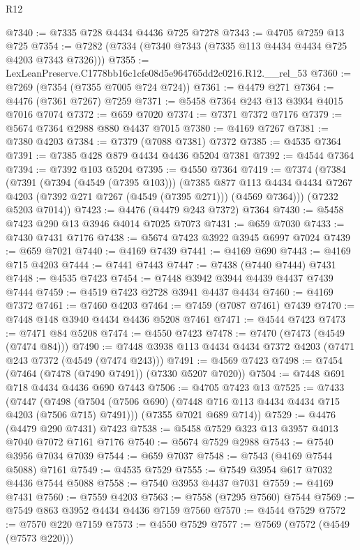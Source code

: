 \begin{lexlean}{R12}
\begin{coremodule}
@7340 := @7335 @728 @4434 @4436 @725 @7278
@7343 := @4705 @7259 @13 @725
@7354 := @7282 (@7334 (@7340 @7343 (@7335 @113 @4434 @4434 @725 @4203 @7343 @7326)))
@7355 := LexLeanPreserve.C1778bb16c1cfe08d5e964765dd2c0216.R12.__rel_53
@7360 := @7269 (@7354 (@7355 @7005 @724 @724))
@7361 := @4479 @271
@7364 := @4476 (@7361 @7267) @7259
@7371 := @5458 @7364 @243 @13 @3934 @4015 @7016 @7074
@7372 := @659 @7020
@7374 := @7371 @7372 @7176
@7379 := @5674 @7364 @2988 @880 @4437 @7015
@7380 := @4169 @7267
@7381 := @7380 @4203
@7384 := @7379 (@7088 @7381) @7372
@7385 := @4535 @7364
@7391 := @7385 @428 @879 @4434 @4436 @5204 @7381
@7392 := @4544 @7364
@7394 := @7392 @103 @5204
@7395 := @4550 @7364
@7419 := @7374
    (@7384
      (@7391
        (@7394 (@4549 (@7395 @103)))
        (@7385
          @877
          @113
          @4434
          @4434
          @7267
          @4203
          (@7392 @271 @7267 (@4549 (@7395 @271)))
          (@4569 @7364)))
      (@7232 @5203 @7014))
@7423 := @4476 (@4479 @243 @7372) @7364
@7430 := @5458 @7423 @290 @13 @3946 @4014 @7025 @7073
@7431 := @659 @7030
@7433 := @7430 @7431 @7176
@7438 := @5674 @7423 @3922 @3945 @6997 @7024
@7439 := @659 @7021
@7440 := @4169 @7439
@7441 := @4169 @690
@7443 := @4169 @715 @4203
@7444 := @7441 @7443
@7447 := @7438 (@7440 @7444) @7431
@7448 := @4535 @7423
@7454 := @7448 @3942 @3944 @4439 @4437 @7439 @7444
@7459 := @4519 @7423 @2728 @3941 @4437 @4434
@7460 := @4169 @7372
@7461 := @7460 @4203
@7464 := @7459 (@7087 @7461) @7439
@7470 := @7448 @148 @3940 @4434 @4436 @5208 @7461
@7471 := @4544 @7423
@7473 := @7471 @84 @5208
@7474 := @4550 @7423
@7478 := @7470 (@7473 (@4549 (@7474 @84)))
@7490 := @7448 @3938 @113 @4434 @4434 @7372 @4203 (@7471 @243 @7372 (@4549 (@7474 @243)))
@7491 := @4569 @7423
@7498 := @7454 (@7464 (@7478 (@7490 @7491)) (@7330 @5207 @7020))
@7504 := @7448 @691 @718 @4434 @4436 @690 @7443
@7506 := @4705 @7423 @13
@7525 := @7433
    (@7447
      (@7498 (@7504 (@7506 @690) (@7448 @716 @113 @4434 @4434 @715 @4203 (@7506 @715) @7491)))
      (@7355 @7021 @689 @714))
@7529 := @4476 (@4479 @290 @7431) @7423
@7538 := @5458 @7529 @323 @13 @3957 @4013 @7040 @7072 @7161 @7176
@7540 := @5674 @7529 @2988
@7543 := @7540 @3956 @7034 @7039
@7544 := @659 @7037
@7548 := @7543 (@4169 @7544 @5088) @7161
@7549 := @4535 @7529
@7555 := @7549 @3954 @617 @7032 @4436 @7544 @5088
@7558 := @7540 @3953 @4437 @7031
@7559 := @4169 @7431
@7560 := @7559 @4203
@7563 := @7558 (@7295 @7560) @7544
@7569 := @7549 @863 @3952 @4434 @4436 @7159 @7560
@7570 := @4544 @7529
@7572 := @7570 @220 @7159
@7573 := @4550 @7529
@7577 := @7569 (@7572 (@4549 (@7573 @220)))

\end{coremodule}
\end{lexlean}
